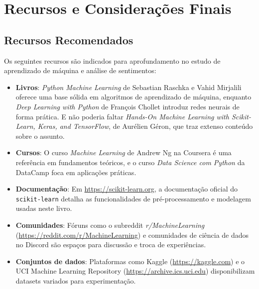 \documentclass[a4paper,12pt,openany]{book}
\begin{document}

\chapter{Recursos e Considerações Finais}

\section{Recursos Recomendados}
Os seguintes recursos são indicados para aprofundamento no estudo de aprendizado de máquina e análise de sentimentos:
\begin{itemize}
    \item \textbf{Livros}: \textit{Python Machine Learning} de Sebastian Raschka e Vahid Mirjalili oferece uma base sólida em algoritmos de aprendizado de máquina, enquanto \textit{Deep Learning with Python} de François Chollet introduz redes neurais de forma prática. E não poderia faltar \textit{Hands-On Machine Learning with Scikit-Learn, Keras, and TensorFlow}, de Aurélien Géron, que traz extenso conteúdo sobre o assunto.
    \item \textbf{Cursos}: O curso \textit{Machine Learning} de Andrew Ng na Coursera é uma referência em fundamentos teóricos, e o curso \textit{Data Science com Python} da DataCamp foca em aplicações práticas.
    \item \textbf{Documentação}: Em \url{https://scikit-learn.org}, a documentação oficial do \texttt{scikit-learn} detalha as funcionalidades de pré-processamento e modelagem usadas neste livro.
    \item \textbf{Comunidades}: Fóruns como o subreddit \textit{r/MachineLearning} (\url{https://reddit.com/r/MachineLearning}) e comunidades de ciência de dados no Discord são espaços para discussão e troca de experiências.
    \item \textbf{Conjuntos de dados}: Plataformas como Kaggle (\url{https://kaggle.com}) e o UCI Machine Learning Repository (\url{https://archive.ics.uci.edu}) disponibilizam datasets variados para experimentação.
\end{itemize}
\end{document}
